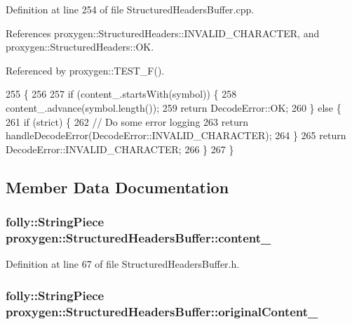 Definition at line 254 of file Structured\+Headers\+Buffer.\+cpp.



References proxygen\+::\+Structured\+Headers\+::\+I\+N\+V\+A\+L\+I\+D\+\_\+\+C\+H\+A\+R\+A\+C\+T\+ER, and proxygen\+::\+Structured\+Headers\+::\+OK.



Referenced by proxygen\+::\+T\+E\+S\+T\+\_\+\+F().


\begin{DoxyCode}
255                \{
256 
257   \textcolor{keywordflow}{if} (content_.startsWith(symbol)) \{
258     content_.advance(symbol.length());
259     \textcolor{keywordflow}{return} DecodeError::OK;
260   \} \textcolor{keywordflow}{else} \{
261     \textcolor{keywordflow}{if} (strict) \{
262       \textcolor{comment}{// Do some error logging}
263       \textcolor{keywordflow}{return} handleDecodeError(DecodeError::INVALID\_CHARACTER);
264     \}
265     \textcolor{keywordflow}{return} DecodeError::INVALID\_CHARACTER;
266   \}
267 \}
\end{DoxyCode}


\subsection{Member Data Documentation}
\subsubsection[{content\+\_\+}]{\setlength{\rightskip}{0pt plus 5cm}folly\+::\+String\+Piece proxygen\+::\+Structured\+Headers\+Buffer\+::content\+\_\+\hspace{0.3cm}{\ttfamily [private]}}\label{classproxygen_1_1StructuredHeadersBuffer_ad8382b8a906f988ab748a15a4c097908}


Definition at line 67 of file Structured\+Headers\+Buffer.\+h.

\subsubsection[{original\+Content\+\_\+}]{\setlength{\rightskip}{0pt plus 5cm}folly\+::\+String\+Piece proxygen\+::\+Structured\+Headers\+Buffer\+::original\+Content\+\_\+\hspace{0.3cm}{\ttfamily [private]}}\label{classproxygen_1_1StructuredHeadersBuffer_ab8306a384ece4a4e16b08c3da9867ec7}


